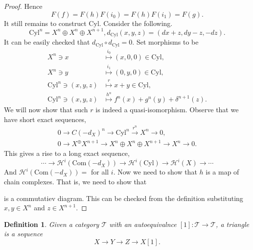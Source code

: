 \documentclass[10pt]{article}
\numberwithin{equation}{section}
\newtheorem{definition}{Definition}[section]
\newcommand{\cH}[0]{\mathcal{H}}
\newcommand{\sT}[0]{\mathscr{T}}
\newcommand{\Com}[0]{\mathrm{Com}}
\begin{document}
\begin{proof}
    Hence 
    \begin{equation*}
        F(f) = F(h)F(i_0) = F(h)F(i_1) = F(g).
    \end{equation*}
    It still remains to construct $\mathrm{Cyl}$. Consider the following.
    \begin{equation*}
        \mathrm{Cyl}^n = X^n\oplus X^n\oplus X^{n+1},d_{\mathrm{Cyl}}(x,y,z) = (dx+z,dy-z,-dz).
    \end{equation*}
    It can be easily checked that $d_\mathrm{Cyl}\circ d_\mathrm{Cyl} = 0$. Set morphisms to be 
    \begin{align*}
        X^n\ni x&\stackrel{i_0}{\mapsto}(x,0,0) \in\mathrm{Cyl},\\
        X^n\ni y&\stackrel{i_1}{\mapsto}(0,y,0) \in\mathrm{Cyl},\\
        \mathrm{Cyl}^n\ni (x,y,z)&\stackrel{r}{\mapsto} x+y\in \mathrm{Cyl},\\
        \mathrm{Cyl}^n\ni (x,y,z)&\stackrel{h^n}{\mapsto}f^n(x)+g^n(y)+\delta^{n+1}(z).
    \end{align*}
    We will now show that such $r$ is indeed a quasi-isomorphism. Observe that we have short exact sequences,
    \begin{align*}
        0\to C(-d_X)^n\to\mathrm{Cyl}^n\stackrel{r^n}{\to}X^n\to0,\\
        0\to X^\oplus X^{n+1}\to X^n\oplus X^n\oplus X^{n+1}\to X^n\to0.
    \end{align*}
    This gives a rise to a long exact sequence,
    \begin{equation*}
        \cdots\to \cH^i(\Com(-d_X))\to\cH^i(\mathrm{Cyl})\to\cH^i(X)\to \cdots
    \end{equation*}
    And $\cH^i(\Com(-d_X))=$ for all $i$. Now we need to show that $h$ is a map of chain complexes. That is, we need to show that
    \begin{center}
    \end{center}
    is a commutatiev diagram. This can be checked from the definition substituting $x,y\in X^n$ and $z\in X^{n+1}$.
\end{proof}

\begin{definition}
    Given a category $\sT$ with an autoequivalnce $[1]:\sT\to\sT$, a triangle is a sequence 
    \begin{equation*}
        X\to Y\to Z\to X[1].
    \end{equation*}
\end{definition}
\end{document}
